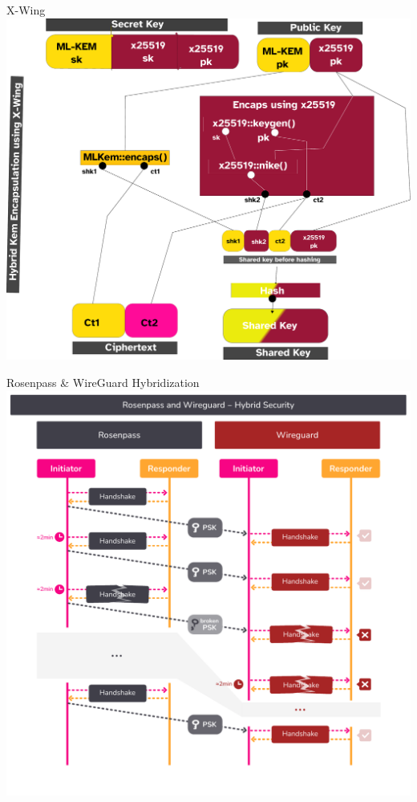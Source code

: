 \begin{frame}{X-Wing}
  \hypertarget{x-wing}{}
  \centering
  \includegraphics[height=.85\textheight]{graphics/xwing.pdf}
\end{frame}

\begin{frame}{Rosenpass \& WireGuard Hybridization}
  \hypertarget{hybrid-security-with-wireguard}{}
  \centering
  \includegraphics[height=1.03\textheight, clip=true,trim=0cm 0cm 0cm 3.2cm]{graphics/rosenpass-wireguard-hybrid-security.pdf}
\end{frame}

